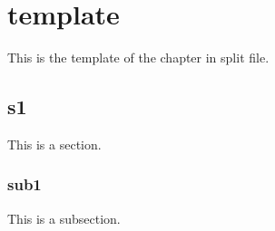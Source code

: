 \chapter{template}
This is the template of the chapter in split file.

\section{s1}
This is a section.

\subsection{sub1}
This is a subsection.